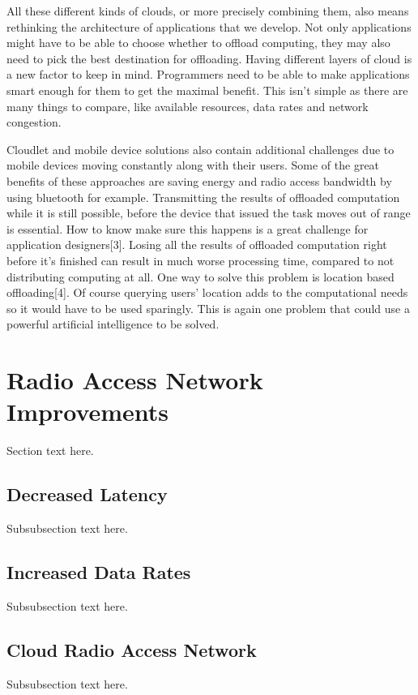 \documentclass[conference]{IEEEtran}
\begin{document}
\par
All these different kinds of clouds, or more precisely combining them, also means rethinking the architecture of applications that we develop. Not only applications might have to be able to choose whether to offload computing, they may also need to pick the best destination for offloading. Having different layers of cloud is a new factor to keep in mind. Programmers need to be able to make applications smart enough for them to get the maximal benefit. This isn't simple as there are many things to compare, like available resources, data rates and network congestion.
\par
Cloudlet and mobile device solutions also contain additional challenges due to mobile devices moving constantly along with their users. Some of the great benefits of these approaches are saving energy and radio access bandwidth by using bluetooth for example. Transmitting the results of offloaded computation while it is still possible, before the device that issued the task moves out of range is essential. How to know make sure this happens is a great challenge for application designers[3]. Losing all the results of offloaded computation right before it's finished can result in much worse processing time, compared to not distributing computing at all. One way to solve this problem is location based offloading[4]. Of course querying users' location adds to the computational needs so it would have to be used sparingly. This is again one problem that could use a powerful artificial intelligence to be solved.

\section{Radio Access Network Improvements}
Section text here.

\subsection{Decreased Latency}
Subsubsection text here.

\subsection{Increased Data Rates}
Subsubsection text here.

\subsection{Cloud Radio Access Network}
Subsubsection text here.
\end{document}
